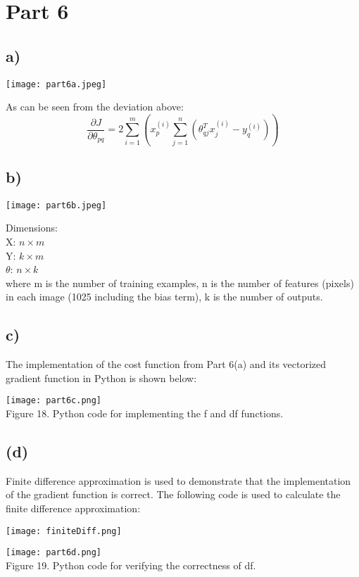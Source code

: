 \documentclass{article}
\begin{document}
\newpage
\section*{Part 6}
\subsection*{a)}
\begin{center}
\texttt{[image: part6a.jpeg]}\\
\end{center}

As can be seen from the deviation above: 
\begin{equation}
    \frac{\partial J}{\partial \theta_{pq}} = 2\sum_{i=1}^{m}(x_p^{(i)}\sum_{j=1}^{n}(\theta_{qj}^Tx_j^{(i)}-y_q^{(i)}))
\end{equation}

\subsection*{b)}
\begin{center}
\texttt{[image: part6b.jpeg]}\\
\end{center}

\begin{center}
Dimensions:\\
X: $n\times m$\\
Y: $k\times m$\\
$\theta$: $n\times k$\\
where m is the number of training examples, n is the number of features (pixels) in each image (1025 including the bias term), k is the number of outputs.
\end{center}
\newpage
\subsection*{c)}
The implementation of the cost function from Part 6(a) and its vectorized gradient function in Python is shown below:
\begin{center}
\texttt{[image: part6c.png]}\\
Figure 18. Python code for implementing the f and df functions. 
\end{center}

\subsection*{(d)}
Finite difference approximation is used to demonstrate that the implementation of the gradient function is correct. The following code is used to calculate the finite difference approximation:\\
\begin{left}
\texttt{[image: finiteDiff.png]}
\end{left}
\begin{center}
\texttt{[image: part6d.png]}\\
Figure 19. Python code for verifying the correctness of df. 
\end{center}
\end{document}
